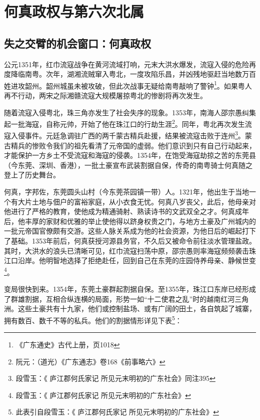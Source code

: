 \chapter{何真政权与第六次北属}

\section{失之交臂的机会窗口：何真政权}

公元1351年，红巾流寇战争在黄河流域打响，元末大洪水爆发，流寇入侵的危险再度降临南粤。次年，湖湘流贼窜入粤北，一度攻陷乐昌，并凶残地驱赶当地数万百姓进攻韶州。韶州城虽未被攻破，但此次战事无疑给南粤敲响了警钟\footnote{《广东通史》古代上册，页1018}。如果粤人再不行动，两宋之际湘赣流寇大规模屠掠粤北的惨剧将再次发生。

随着流寇入侵粤北，珠三角亦发生了社会失序的现象。1353年，南海人邵宗愚纠集起一批海寇，自称元帅，开始了他在珠江口的行劫生涯\footnote{阮元：（道光）《广东通志》卷168《前事略六》}。同年，粤北再次发生流寇入侵事件。元廷急调驻广西的两千蒙古精兵赴援，结果被流寇击败于连州\footnote{段雪玉：《 庐江郡何氏家记 所见元末明初的广东社会》同注395}。蒙古精兵的惨败令我们的祖先看清了元帝国的虚弱。他们意识到只有自己行动起来，才能保护一方乡土不受流寇和海寇的侵袭。1354年，在饱受海寇劫掠之苦的东莞县（今东莞、深圳、香港），一批土豪宣布武装割据自保，传奇的南粤骑士何真随之登上了历史舞台。

何真，字邦佐，东莞圆头山村（今东莞茶园镇一带）人。1321年，他出生于当地一个有大片土地与佃户的富裕家庭，从小衣食无忧。何真八岁丧父，此后，他母亲对他进行了严格的教育，使他成为精通骑射、熟读诗书的文武双全之才。何真成年后，他丰厚的家财和优雅的举止使他得以跻身权贵之门，与地方土豪及广州城内的一批元帝国官僚颇有交游。这些人脉关系成为他的社会资源，为他日后的崛起打下了基础。1353年前后，何真获授河源县务官，不久后又被命令前往淡水管理盐政。其时，大洪水的浪头已清晰可见，红巾流寇扫荡中原，邵宗愚则率海寇频频袭击珠江口沿岸。他明智地选择了拒绝赴任，回到自己在东莞的庄园侍养母亲、静候世变\footnote{段雪玉：《 庐江郡何氏家记 所见元末明初的广东社会》}。

变局很快到来。1354年，东莞土豪群起割据自保。至1355年，珠江口东岸已经形成了群雄割据，互相合纵连横的局面，形势一如“十二使君之乱”时的越南红河三角洲。这些土豪共有十九家，他们或控制盐场、或有广阔的田土，各自筑起了城寨，拥有数百、数千不等的私兵。他们的割据情形详见下表\footnote{此表引自段雪玉：《 庐江郡何氏家记 所见元末明初的广东社会》}：

